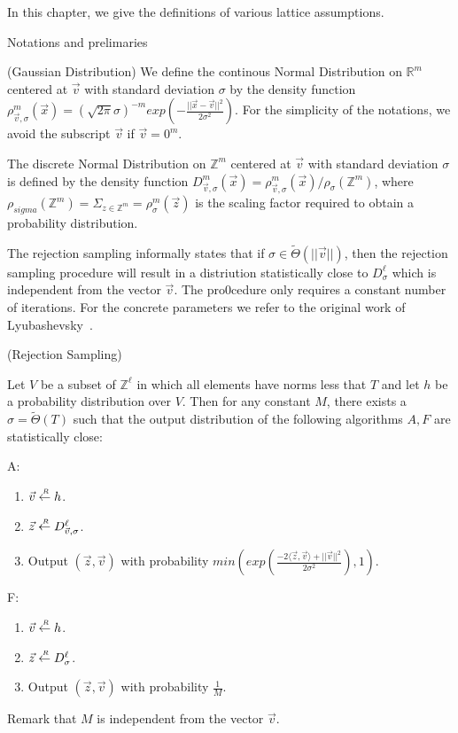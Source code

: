 In this chapter, we give the definitions of various lattice assumptions.

\begin{section}{Notations and prelimaries}
  \begin{definition}{(Gaussian Distribution)}
    We define the continous Normal Distribution on $\mathbb{R}^m$ centered at $\vec{v}$ with standard deviation $\sigma$ by the density function $\rho_{\vec{v}, \sigma}^m(\vec{x}) =  (\sqrt{2\pi} \sigma)^{-m}exp(-\frac{||\vec{x} - \vec{v}||^2}{2 \sigma^2})$. For the simplicity of the notations, we avoid the subscript $\vec{v}$ if $\vec{v} = 0^m$.

    The discrete Normal Distribution on $\mathbb{Z}^m$ centered at $\vec{v}$ with standard deviation $\sigma$ is defined by the density function $D_{\vec{v}, \sigma}^{m}(\vec{x}) =  \rho_{\vec{v}, \sigma}^m(\vec{x})/ \rho_{\sigma}(\mathbb{Z}^m)$, where $\rho_{sigma}(\mathbb{Z}^m) = \Sigma_{z \in \mathbb{Z}^m} = \rho_{\sigma}^{m}(\vec{z})$ is the scaling factor required to obtain a probability distribution.
  \end{definition}

  The rejection sampling informally states that if $\sigma \in \tilde{\Theta}(||\vec{v}||)$, then the rejection sampling procedure will result in a distriution statistically close to $D_{\sigma}^\ell$ which is independent from the vector $\vec{v}$. The pro0cedure only requires a constant number of iterations. For the concrete parameters we refer to the original work of Lyubashevsky~\cite{DBLP:conf/eurocrypt/Lyubashevsky12}.

  \begin{definition}{(Rejection Sampling)}
    
    Let $V$ be a subset of $\mathbb{Z}^{\ell}$ in which all elements have norms less that $T$ and let $h$ be a probability distribution over $V$. Then for any constant $M$, there exists a $\sigma = \tilde{\Theta}(T)$ such that the output distribution of the following algorithms $A, F$ are statistically close:
    
    A:
    \begin{enumerate}
    \item $\vec{v} \stackrel{{\scriptscriptstyle \mkern4mu R}}{\gets} h$.
    \item $\vec{z} \stackrel{{\scriptscriptstyle \mkern4mu R}}{\gets} D_{\vec{v}, \sigma}^\ell$.
    \item Output $(\vec{z}, \vec{v})$ with probability $min(exp(\frac{-2\langle\vec{z}, \vec{v}\rangle + ||\vec{v}||^2}{2 \sigma^2}),1)$.
    \end{enumerate}

    F:
    \begin{enumerate}
    \item $\vec{v} \stackrel{{\scriptscriptstyle \mkern4mu R}}{\gets} h$.
    \item $\vec{z} \stackrel{{\scriptscriptstyle \mkern4mu R}}{\gets} D_{\sigma}^\ell$.
      \item Output $(\vec{z}, \vec{v})$ with probability $\frac{1}{M}$.
    \end{enumerate}
    
    Remark that $M$ is independent from the vector $\vec{v}$.

  \end{definition}
  
\end{section}

